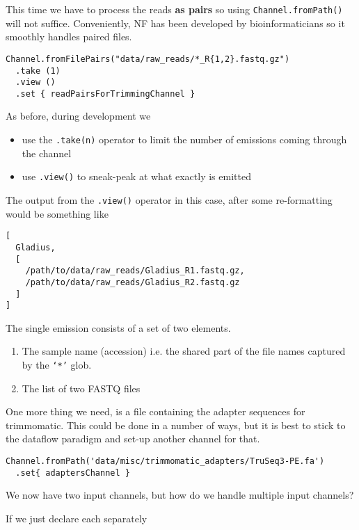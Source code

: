 This time we have to process the reads \textbf{as pairs} so using \texttt{Channel.fromPath()} 
will not suffice. Conveniently, NF has been developed by bioinformaticians so 
it smoothly handles paired files. 

\begin{lstlisting}
Channel.fromFilePairs("data/raw_reads/*_R{1,2}.fastq.gz")
  .take (1)
  .view ()
  .set { readPairsForTrimmingChannel }
\end{lstlisting}


\begin{note}
As before, during development we
\begin{itemize}
 \item use the \texttt{.take(n)} operator to limit the number of emissions coming through the channel
 \item use \texttt{.view()} to sneak-peak at what exactly is emitted
\end{itemize}
\end{note}

The output from the \texttt{.view()} operator in this case,
after some re-formatting would be something like

\begin{lstlisting}
[
  Gladius, 
  [
    /path/to/data/raw_reads/Gladius_R1.fastq.gz, 
    /path/to/data/raw_reads/Gladius_R2.fastq.gz
  ]
]
\end{lstlisting}

The single emission consists of a set of two elements. 
\begin{enumerate}
\item The sample name (accession) i.e. the shared part of the file names captured by the \texttt{`*'} glob. 
\item The list of two FASTQ files 
\end{enumerate}

One more thing we need, is a file containing the adapter sequences for trimmomatic.
This could be done in a number of ways, but it is best to stick to the dataflow paradigm 
and set-up another channel for that.

\begin{lstlisting}
Channel.fromPath('data/misc/trimmomatic_adapters/TruSeq3-PE.fa')
  .set{ adaptersChannel }
\end{lstlisting}

We now have two input channels, but how do we handle multiple input channels? 

If we just declare each separately 

